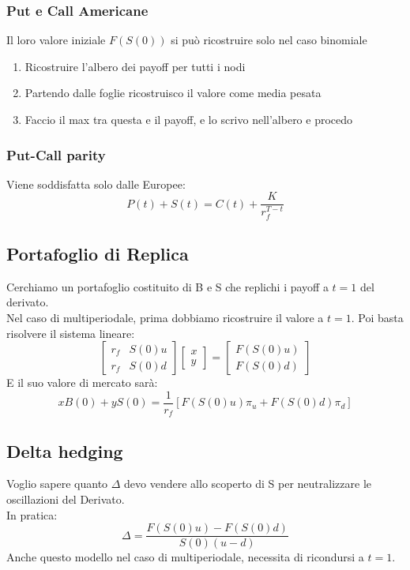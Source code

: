 \documentclass[a4paper,notitlepage]{report}%
\begin{document}
\begin{multicols*}{2}
        \subsubsection*{Put e Call Americane}
            Il loro valore iniziale $F(S(0))$ si può ricostruire
            solo nel caso binomiale
            \begin{enumerate}
                \item Ricostruire l'albero dei payoff per tutti i nodi
                \item Partendo dalle foglie ricostruisco il valore come media pesata
                \item Faccio il max tra questa e il payoff, e lo scrivo nell'albero e procedo
            \end{enumerate}

        \subsubsection*{Put-Call parity}
            Viene soddisfatta solo dalle Europee:
            \[
                P(t) + S(t) = C(t) + \frac{K}{ r_f^{T-t} }    
            \]
    
    
    \subsection*{Portafoglio di Replica}
    Cerchiamo un portafoglio costituito di B e S
    che replichi i payoff a $t=1$ del derivato. \\
    Nel caso di multiperiodale, prima dobbiamo ricostruire il valore
    a $t=1$. Poi basta risolvere il sistema lineare:
    \[
        \begin{bmatrix}
            r_f & S(0)u \\
            r_f & S(0)d  
        \end{bmatrix}
        \begin{bmatrix}
            x \\
            y  
        \end{bmatrix}
        =
        \begin{bmatrix}
            F(S(0)u) \\
            F(S(0)d)  
        \end{bmatrix}
    \]
    E il suo valore di mercato sarà:
    \[
        xB(0)+yS(0) = \frac{1}{r_f} \left[ F(S(0)u) \pi_u + F(S(0)d) \pi_d \right]
    \]


    \subsection*{Delta hedging}
    Voglio sapere quanto $\Delta$ devo vendere allo scoperto di S
    per neutralizzare le oscillazioni del Derivato. \\
    In pratica:
    \[
        \Delta = \frac{F(S(0)u) - F(S(0)d)}{S(0) (u-d)}    
    \]
    Anche questo modello nel caso di multiperiodale,
    necessita di ricondursi a $t=1$.
    

\end{multicols*}
\end{document}
